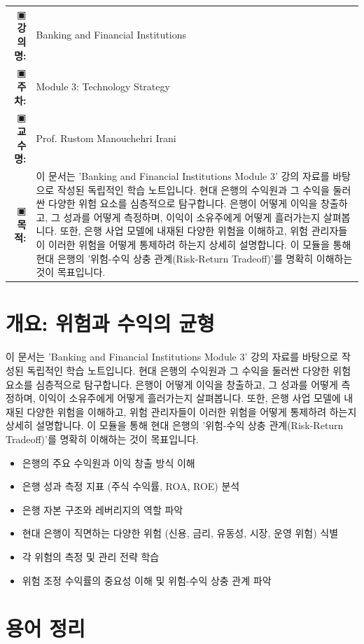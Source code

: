 \documentclass[11pt,a4paper]{article}
\makeatletter
\theoremstyle{definition}
\newcommand{\metainfo}[4]{
\begin{tcolorbox}[
    colback=lightpurple,
    colframe=darkpurple,
    boxrule=1pt,
    arc=2mm,
    left=10pt,
    right=10pt,
    top=8pt,
    bottom=8pt
]
\begin{tabular}{@{}rl@{}}
▣ \textbf{강의명:} & #1 \\[0.3em]
▣ \textbf{주차:} & #2 \\[0.3em]
▣ \textbf{교수명:} & #3 \\[0.3em]
▣ \textbf{목적:} & \begin{minipage}[t]{0.75\textwidth}#4\end{minipage}
\end{tabular}
\end{tcolorbox}
}
\makeatother
\begin{document}
\thispagestyle{firstpage}

\metainfo{Banking and Financial Institutions}{Module 3: Technology Strategy}{Prof. Rustom Manouchehri Irani}{이 문서는 'Banking and Financial Institutions Module 3' 강의 자료를 바탕으로 작성된 독립적인 학습 노트입니다. 현대 은행의 수익원과 그 수익을 둘러싼 다양한 위험 요소를 심층적으로 탐구합니다. 은행이 어떻게 이익을 창출하고, 그 성과를 어떻게 측정하며, 이익이 소유주에게 어떻게 흘러가는지 살펴봅니다. 또한, 은행 사업 모델에 내재된 다양한 위험을 이해하고, 위험 관리자들이 이러한 위험을 어떻게 통제하려 하는지 상세히 설명합니다. 이 모듈을 통해 현대 은행의 '위험-수익 상충 관계(Risk-Return Tradeoff)'를 명확히 이해하는 것이 목표입니다.}

\tableofcontents

\newpage

\section{개요: 위험과 수익의 균형}

이 문서는 'Banking and Financial Institutions Module 3' 강의 자료를 바탕으로 작성된 독립적인 학습 노트입니다.
현대 은행의 수익원과 그 수익을 둘러싼 다양한 위험 요소를 심층적으로 탐구합니다.
은행이 어떻게 이익을 창출하고, 그 성과를 어떻게 측정하며, 이익이 소유주에게 어떻게 흘러가는지 살펴봅니다.
또한, 은행 사업 모델에 내재된 다양한 위험을 이해하고, 위험 관리자들이 이러한 위험을 어떻게 통제하려 하는지 상세히 설명합니다.
이 모듈을 통해 현대 은행의 '위험-수익 상충 관계(Risk-Return Tradeoff)'를 명확히 이해하는 것이 목표입니다.

\begin{summarybox}[title=\textbf{학습 목표 요약}]
\begin{itemize}
    \item 은행의 주요 수익원과 이익 창출 방식 이해
    \item 은행 성과 측정 지표 (주식 수익률, ROA, ROE) 분석
    \item 은행 자본 구조와 레버리지의 역할 파악
    \item 현대 은행이 직면하는 다양한 위험 (신용, 금리, 유동성, 시장, 운영 위험) 식별
    \item 각 위험의 측정 및 관리 전략 학습
    \item 위험 조정 수익률의 중요성 이해 및 위험-수익 상충 관계 파악
\end{itemize}
\end{summarybox}

\newpage
\section{용어 정리}
\end{document}
